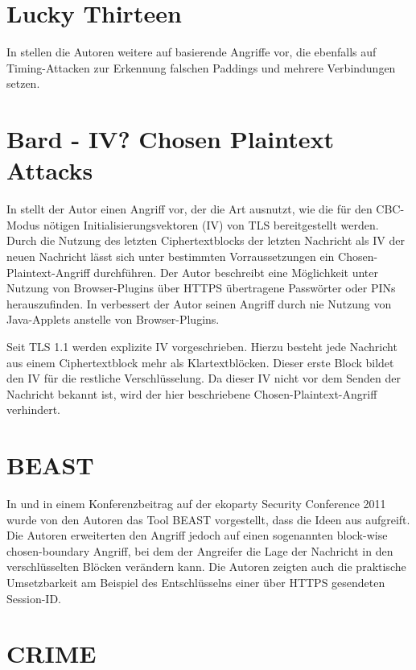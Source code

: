 \documentclass[
    12pt,
    headings=small,
    parskip=half,           %
    bibliography=totoc,
    numbers=noenddot,       %
    open=any,               %
    ]{scrreprt}
\begin{document}
\section{Lucky Thirteen}

In \cite{paterson13} stellen die Autoren weitere auf \cite{vaudenay02} basierende Angriffe vor, die ebenfalls auf Timing-Attacken zur Erkennung falschen Paddings und mehrere Verbindungen setzen.

\section{Bard - IV? Chosen Plaintext Attacks}

In \cite{bard04} stellt der Autor einen Angriff vor, der die Art ausnutzt, wie die für den CBC-Modus nötigen Initialisierungsvektoren (IV) von TLS bereitgestellt werden. Durch die Nutzung des letzten Ciphertextblocks der letzten Nachricht als IV der neuen Nachricht lässt sich unter bestimmten Vorraussetzungen ein Chosen-Plaintext-Angriff durchführen. Der Autor beschreibt eine Möglichkeit unter Nutzung von Browser-Plugins über HTTPS übertragene Passwörter oder PINs herauszufinden. In \cite{bard06} verbessert der Autor seinen Angriff durch nie Nutzung von Java-Applets anstelle von Browser-Plugins.

Seit TLS 1.1 werden explizite IV vorgeschrieben. Hierzu besteht jede Nachricht aus einem Ciphertextblock mehr als Klartextblöcken. Dieser erste Block bildet den IV für die restliche Verschlüsselung. Da dieser IV nicht vor dem Senden der Nachricht bekannt ist, wird der hier beschriebene Chosen-Plaintext-Angriff verhindert.

\section{BEAST}

In \cite{duong11} und in einem Konferenzbeitrag auf der ekoparty Security Conference 2011 wurde von den Autoren das Tool BEAST vorgestellt, dass die Ideen aus \cite{bard04} aufgreift. Die Autoren erweiterten den Angriff jedoch auf einen sogenannten block-wise chosen-boundary Angriff, bei dem der Angreifer die Lage der Nachricht in den verschlüsselten Blöcken verändern kann. Die Autoren zeigten auch die praktische Umsetzbarkeit am Beispiel des Entschlüsselns einer über HTTPS gesendeten Session-ID.

\section{CRIME}
\end{document}
